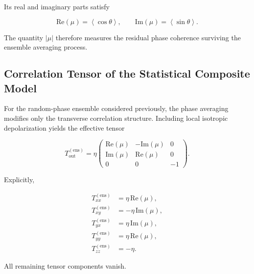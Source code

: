 Its real and imaginary parts satisfy

\begin{equation}
\mathrm{Re}(\mu)
=
\left\langle
\cos\theta
\right\rangle,
\qquad
\mathrm{Im}(\mu)
=
\left\langle
\sin\theta
\right\rangle.
\label{eq:ensemble_mu_components}
\end{equation}

\medskip

The quantity \( |\mu| \) therefore measures the residual phase coherence surviving the ensemble averaging process.

\medskip


\subsection{Correlation Tensor of the Statistical Composite Model}

For the random-phase ensemble considered previously, the phase averaging modifies only the transverse correlation structure. Including local isotropic depolarization yields the effective tensor

\begin{equation}
T_{\mathrm{out}}^{(\mathrm{ens})}
=
\eta
\begin{pmatrix}
\mathrm{Re}(\mu)
&
-\mathrm{Im}(\mu)
&
0
\\
\mathrm{Im}(\mu)
&
\mathrm{Re}(\mu)
&
0
\\
0
&
0
&
-1
\end{pmatrix}.
\label{eq:ensemble_composite_tensor}
\end{equation}

Explicitly,

\begin{align}
T_{xx}^{(\mathrm{ens})}
&=
\eta\,\mathrm{Re}(\mu),
\\
T_{xy}^{(\mathrm{ens})}
&=
-\eta\,\mathrm{Im}(\mu),
\\
T_{yx}^{(\mathrm{ens})}
&=
\eta\,\mathrm{Im}(\mu),
\\
T_{yy}^{(\mathrm{ens})}
&=
\eta\,\mathrm{Re}(\mu),
\\
T_{zz}^{(\mathrm{ens})}
&=
-\eta.
\end{align}

All remaining tensor components vanish.

\medskip

